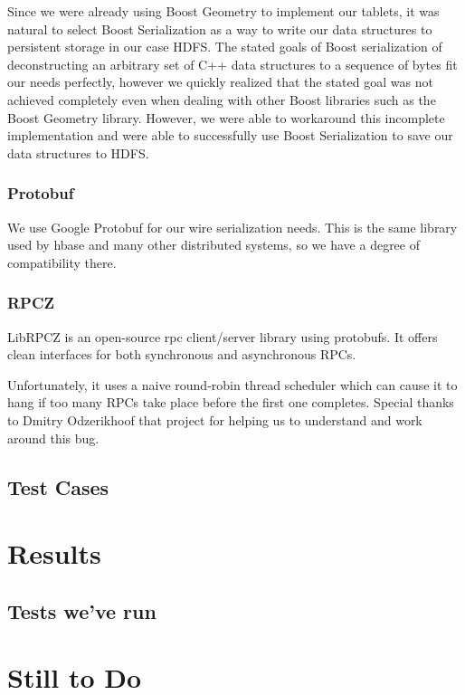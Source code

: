 \documentclass[11pt]{article}
\begin{document}
Since we were already using Boost Geometry to implement our tablets, it was natural to select Boost Serialization as a way to write our data structures to persistent storage in our case HDFS. The stated goals of Boost serialization of deconstructing an arbitrary set of C++ data structures to a sequence of bytes fit our needs perfectly, however we quickly realized that the stated goal was not achieved completely even when dealing with other Boost libraries such as the Boost Geometry library. However, we were able to workaround this incomplete implementation and were able to successfully use Boost Serialization to save our data structures to HDFS.

\subsubsection{Protobuf}

We use Google Protobuf for our wire serialization needs. This is the same library used by hbase and many other distributed systems, so we have a degree of compatibility there.

\subsubsection{RPCZ}

LibRPCZ is an open-source rpc client/server library using protobufs. It offers clean interfaces for both synchronous and asynchronous RPCs.

Unfortunately, it uses a naive round-robin thread scheduler which can cause it to hang if too many RPCs take place before the first one completes. Special thanks to Dmitry Odzerikhoof that project for helping us to understand and work around this bug.

\subsection{Test Cases}

\section{Results}

\subsection{Tests we've run}

\section{Still to Do}
\end{document}
